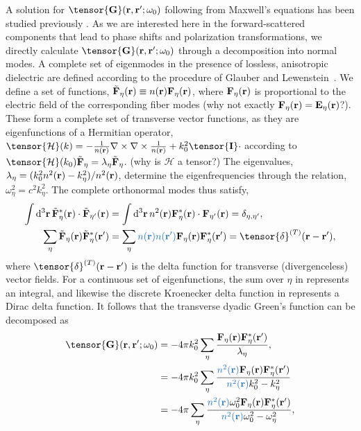 \documentclass[preprint,aps,pra,onecolumn]{revtex4-1} %
\newcommand{\fidx}{\eta}
\newcommand{\change}[1]{{\color{RoyalBlue} #1}}
\newcommand{\comment}[1]{{\color{Maroon} #1}}
\begin{document}
A solution for $\tensor{\mathbf{G}}(\br ,\br' ; \omega_0)$ following from Maxwell's equations 
has been studied previously \cite{sakoda_optical_1996,sondergaard_general_2001,wubs_multiple-scattering_2004}.  As we are interested here in the forward-scattered components that lead to phase shifts and polarization transformations, we directly calculate $\tensor{\mathbf{G}}(\br ,\br' ; \omega_0)$ through a decomposition into normal modes.  A complete set of eigenmodes in the presence of lossless, anisotropic dielectric are defined according to the procedure of Glauber and Lewenstein~\cite{glauber_quantum_1991}.  We define a set of functions, $\tilde{\mathbf{F}}_\fidx(\br) \equiv n(\br) \mathbf{F}_\fidx (\br)$, where $\mathbf{F}_\fidx (\br)$ is proportional to the electric field of the corresponding fiber modes \comment{(why not exactly $\mathbf{F}_\fidx (\br) = \mathbf{E}_\fidx (\br)$?)}.  These form a complete set of transverse vector functions, as they are eigenfunctions of a Hermitian operator, 
\change{$\tensor{\mathcal{H}}(k) = -\frac{1}{n(\br)} \nabla\times\nabla\times \frac{1}{n(\br)} + k^2_0 \tensor{\mathbf{I}} \cdot$ according to  $\tensor{\mathcal{H}}(k_0)  \tilde{\mathbf{F}}_\fidx = \lambda_\fidx \tilde{\mathbf{F}}_\fidx$.}\comment{(why is $\mathcal{H}$ a tensor?)} The eigenvalues, \change{$\lambda_\fidx= (k_0^2n^2(\mbf{r})-k_\fidx^2)/n^2(\mbf{r})$}, determine the eigenfrequencies through the relation, $\omega_\fidx^2 = c^2 k_\fidx^2$. The complete orthonormal modes thus satisfy,
\begin{align}
\int \mathrm{d}^3\br \, \tilde{\mathbf{F}}_\fidx^* (\br)\cdot \tilde{\mathbf{F}}_{\eta'}(\br)  &= \int \mathrm{d}^3\br \, n^2(\br) 
\mathbf{F}_\fidx^* (\br)\cdot  \mathbf{F}_{\fidx'}(\br) =\delta_{\fidx, \fidx'},\label{Eq::Orthogonality}
\\
\sum_\fidx \tilde{\mathbf{F}}_\fidx (\br) \tilde{\mathbf{F}}_\fidx^*(\br') &= \sum_\fidx \change{n(\br)n(\br')} 
\mathbf{F}_\fidx  (\br) \mathbf{F}_\fidx^*(\br') =\tensor{\delta}^{(T)}(\br-\br'), \label{Eq::Completeness}
\end{align}
where $\tensor{\delta}^{(T)}(\br-\br')$ is the delta function for transverse (divergenceless) vector 
fields.  For a continuous set of eigenfunctions, the sum over $\fidx$ in  represents an integral, and likewise the discrete Kroenecker delta function in  represents a Dirac delta function.  It follows that the transverse dyadic Green's function can be decomposed as~\cite{sondergaard_general_2001}
	\begin{align}
		\tensor{\mathbf{G}}(\br,\br'; \omega_0)& = -4\pi k_0^2 \sum_{\fidx} \frac{ \mathbf{F}_\fidx (\br) 
\mathbf{F}^*_\fidx (\br')}{\lambda_\fidx}, \\
	&= -4\pi k_0^2 \sum_{\fidx} \frac{ \change{n^2(\mbf{r})}\mathbf{F}_\fidx (\br) 
\mathbf{F}^*_\fidx (\br')}{\change{n^2(\mbf{r})}k_0^2  - k_\fidx^2} \\
	&= -4\pi \sum_{\fidx} \frac{\change{n^2(\mbf{r})} \omega_0^2 \mathbf{F}_\fidx (\br) 
\mathbf{F}^*_\fidx (\br')}{ \change{n^2(\mbf{r})}\omega_0^2-\omega_\fidx^2},
	\end{align}
\end{document}
